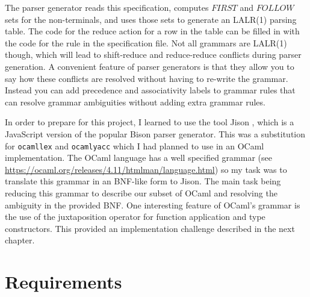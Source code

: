 \documentclass[12pt,a4paper,twoside,openright]{report}
\begin{document}
The parser generator reads this specification, computes $FIRST$ and $FOLLOW$ sets for the non-terminals, and uses those sets to generate an LALR(1) parsing table.
The code for the reduce action for a row in the table can be filled in with the code for the rule in the specification file.
Not all grammars are LALR(1) though, which will lead to shift-reduce and reduce-reduce conflicts during parser generation.
A convenient feature of parser generators is that they allow you to say how these conflicts are resolved without having to re-write the grammar.
Instead you can add precedence and associativity labels to grammar rules that can resolve grammar ambiguities without adding extra grammar rules.

In order to prepare for this project, I learned to use the tool Jison \cite{jison}, which is a JavaScript version of the popular Bison parser generator.
This was a substitution for {\tt ocamllex} and {\tt ocamlyacc} which I had planned to use in an OCaml implementation.
The OCaml language has a well specified grammar (see \url{https://ocaml.org/releases/4.11/htmlman/language.html}) so my task was to translate this grammar in an BNF-like form to Jison.
The main task being reducing this grammar to describe our subset of OCaml and resolving the ambiguity in the provided BNF.
One interesting feature of OCaml's grammar is the use of the juxtaposition operator for function application and type constructors.
This provided an implementation challenge described in the next chapter.

\section{Requirements}
\end{document}
